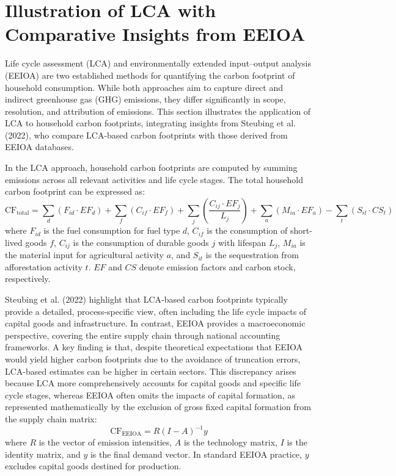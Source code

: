 \documentclass[12pt,a4paper]{article}
\begin{document}
\section{Illustration of LCA with Comparative Insights from EEIOA}

Life cycle assessment (LCA) and environmentally extended input--output analysis (EEIOA) are two established methods for quantifying the carbon footprint of household consumption. While both approaches aim to capture direct and indirect greenhouse gas (GHG) emissions, they differ significantly in scope, resolution, and attribution of emissions. This section illustrates the application of LCA to household carbon footprints, integrating insights from Steubing et al. (2022), who compare LCA-based carbon footprints with those derived from EEIOA databases.

In the LCA approach, household carbon footprints are computed by summing emissions across all relevant activities and life cycle stages. The total household carbon footprint can be expressed as:
\begin{equation}
\text{CF}_{\text{total}} = \sum_d (F_{id} \cdot EF_d) 
+ \sum_f (C_{if} \cdot EF_f) 
+ \sum_j \left( \frac{C_{ij} \cdot EF_j}{L_j} \right)
+ \sum_a (M_{ia} \cdot EF_a)
- \sum_t (S_{it} \cdot CS_t)
\end{equation}
where $F_{id}$ is the fuel consumption for fuel type $d$, $C_{if}$ is the consumption of short-lived goods $f$, $C_{ij}$ is the consumption of durable goods $j$ with lifespan $L_j$, $M_{ia}$ is the material input for agricultural activity $a$, and $S_{it}$ is the sequestration from afforestation activity $t$. $EF$ and $CS$ denote emission factors and carbon stock, respectively.

Steubing et al. (2022) highlight that LCA-based carbon footprints typically provide a detailed, process-specific view, often including the life cycle impacts of capital goods and infrastructure. In contrast, EEIOA provides a macroeconomic perspective, covering the entire supply chain through national accounting frameworks. A key finding is that, despite theoretical expectations that EEIOA would yield higher carbon footprints due to the avoidance of truncation errors, LCA-based estimates can be higher in certain sectors. This discrepancy arises because LCA more comprehensively accounts for capital goods and specific life cycle stages, whereas EEIOA often omits the impacts of capital formation, as represented mathematically by the exclusion of gross fixed capital formation from the supply chain matrix:
\begin{equation}
\text{CF}_{\text{EEIOA}} = R (I - A)^{-1} y
\end{equation}
where $R$ is the vector of emission intensities, $A$ is the technology matrix, $I$ is the identity matrix, and $y$ is the final demand vector. In standard EEIOA practice, $y$ excludes capital goods destined for production.
\end{document}
